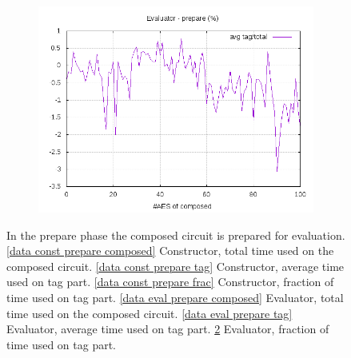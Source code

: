 \documentclass[10pt,a4paper]{article}
\begin{document}
\begin{figure}[h]
\begin{subfigure}[t]{0.3\textwidth}
        \includegraphics[width=\textwidth]{eval_prepare_frac}
        \caption{}
        \label{data eval prepare frac}
    \end{subfigure}
    \caption{In the prepare phase the composed circuit is prepared for evaluation. \ref{data const prepare composed} Constructor, total time used on the composed circuit. \ref{data const prepare tag} Constructor, average time used on tag part. \ref{data const prepare frac} Constructor, fraction of time used on tag part. \ref{data eval prepare composed} Evaluator, total time used on the composed circuit. \ref{data eval prepare tag} Evaluator, average time used on tag part. \ref{data eval prepare frac} Evaluator, fraction of time used on tag part.}
\end{figure}
\end{document}
